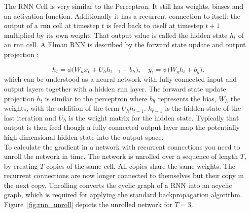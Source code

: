 \documentclass[twoside,a4paper,10pt,DIV=12,BCOR=12mm]{scrartcl}
\begin{document}
\begin{center}
\end{center}

The RNN Cell is very similar to the Perceptron. It still has weights, biases and an activation function. Additionally 
it has a recurrent connection to itself: the output of a rnn cell at timestep $t$ is feed back to itself at timestep
$t+1$ multiplied by its own weight. That output value is called the hidden state $h_t$ of an rnn cell.
A Elman RNN is described by the forward state update and output projection \cite{Elman90}:

$$
h_t = \phi\!\bigl(W_h x_t + U_h h_{t-1} + b_h\bigr), \quad
y_t = \psi\!\bigl(W_y h_t + b_y\bigr).
$$
which can be understood as a neural network with fully connected input and output layers together with a hidden rnn layer.
The forward state update projection $h_t$ is similar to the perceptron where $b_h$ represents the bias, $W_h$ the weights,
with the addition of the term $U_hh_{t-1}$. $h_{t-1}$ is the hidden state of the last iteration and $U_h$ is the weight
matrix for the hidden state. Typically that output is then feed though a fully connected output layer map the
potentially high dimensional hidden state into the output space.\\


To calculate the gradient in a network with recurrent connections you need to unroll the network in time. The network
is unrolled over a sequence of length $T$, by creating $T$ copies of the same cell. All copies share the same weights.
The recurrent connections are now longer connected to themselves but their copy in the next copy. Unrolling converts 
the cyclic graph of a RNN into an acyclic graph, which is required for applying the standard backpropagation algorithm.
Figure~\ref{fig:rnn_unroll} depicts the unrolled network for $T=3$.
\end{document}
